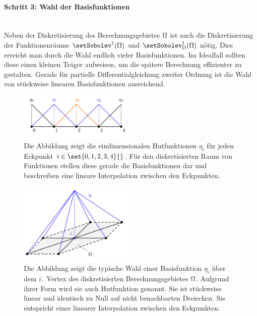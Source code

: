 \documentclass[crop=false]{standalone}
\begin{document}
      \paragraph{Schritt 3: Wahl der Basisfunktionen} %
      \label{par:schritt_3_wahl_der_basisfunktionen}
        \hfill\\
        Neben der Diskretisierung des Berechnungsgebietes $\Omega$ ist auch die Diskretisierung der Funktionenräume $\setSobolev^1(\domain)$ und $\setSobolev^1_\mathrm{D}(\domain)$ nötig.
        Dies erreicht man durch die Wahl endlich vieler Basisfunktionen.
        Im Idealfall sollten diese einen kleinen Träger aufweisen, um die spätere Berechnung effizienter zu gestalten.
        Gerade für partielle Differentialgleichung zweiter Ordnung ist die Wahl von stückweise linearen Basisfunktionen ausreichend.
        \begin{figure}[h]
          \center
          \includegraphics[width=0.5\textwidth]{images/hat_function_one_dimension_example.pdf}
          \caption[Eindimensionale Hutfunktionen]{%
            Die Abbildung zeigt die eindimensionalen Hutfunktionen $η_i$ für jeden Eckpunkt $i\in\set{0,1,2,3,4}{}$.
            Für den diskretisierten Raum von Funktionen stellen diese gerade die Basisfunktionen dar und beschreiben eine lineare Interpolation zwischen den Eckpunkten.
          }
          \label{fig:hat-function-example}
        \end{figure}
        \begin{figure}[h]
          \center
          \includegraphics[width=0.5\textwidth]{images/hat_function.pdf}
          \caption[Zweidimensionale Hutfunktion]{%
            Die Abbildung zeigt die typische Wahl einer Basisfunktion $η_i$ über dem $i$.~Vertex des diskretisierten Berechnungsgebietes $\Omega$.
            Aufgrund ihrer Form wird sie auch Hutfunktion genannt.
            Sie ist stückweise linear und identisch zu Null auf nicht benachbarten Dreiecken.
            Sie entspricht einer linearer Interpolation zwischen den Eckpunkten.
          }
          \label{fig:hat-function}
        \end{figure}
\end{document}
